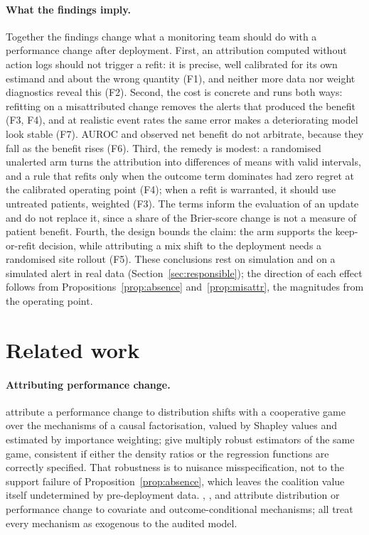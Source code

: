 \documentclass[letterpaper]{article} %
\begin{document}
\paragraph{What the findings imply.} Together the findings change what a
monitoring team should do with a performance change after deployment. First,
an attribution computed without action logs should not trigger a refit: it is
precise, well calibrated for its own estimand and about the wrong quantity
(F1), and neither more data nor weight diagnostics reveal this (F2). Second,
the cost is concrete and runs both ways: refitting on a misattributed change
removes the alerts that produced the benefit (F3, F4), and at realistic event
rates the same error makes a deteriorating model look stable (F7). AUROC and
observed net benefit do not arbitrate, because they fall as the benefit rises
(F6). Third, the remedy is modest: a randomised unalerted arm turns the
attribution into differences of means with valid intervals, and a rule that
refits only when the outcome term dominates had zero regret at the calibrated
operating point (F4); when a refit is warranted, it should use untreated
patients, weighted (F3). The terms inform the evaluation of an update and do
not replace it, since a share of the Brier-score change is not a measure of
patient benefit. Fourth, the
design bounds the claim: the arm supports the keep-or-refit decision, while
attributing a mix shift to the deployment needs a randomised site rollout
(F5). These conclusions rest on simulation and on a simulated alert in real
data (Section~\ref{sec:responsible}); the direction of each effect follows
from Propositions~\ref{prop:absence} and~\ref{prop:misattr}, the magnitudes
from the operating point.

\section{Related work}
\label{sec:related}

\paragraph{Attributing performance change.} \citet{zhang2023attributing}
attribute a performance change to distribution shifts with a cooperative game
over the mechanisms of a causal factorisation, valued by Shapley values and
estimated by importance weighting; \citet{quintasmartinez2024multiply} give
multiply robust estimators of the same game, consistent if either the density
ratios or the regression functions are correctly specified. That robustness
is to nuisance misspecification, not to the support failure of
Proposition~\ref{prop:absence}, which leaves the coalition value itself
undetermined by pre-deployment data. \citet{budhathoki2021rootcauses},
\citet{cai2023disde}, \citet{singh2024hierarchical} and
\citet{gordaliza2025causal} attribute distribution or performance change to
covariate and outcome-conditional mechanisms; all treat every mechanism as
exogenous to the audited model.
\end{document}
